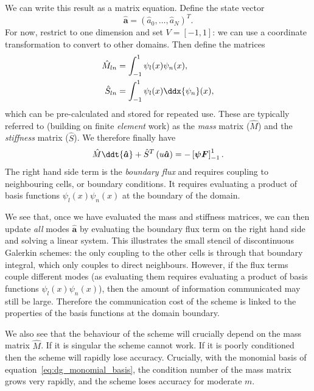 We can write this result as a matrix equation. Define the state vector
%
\begin{equation}
  \label{eq:dg_state_vector}
  \bm{\hat{a}} = (\hat{a}_0, \dots, \hat{a}_N)^T.
\end{equation}
%
For now, restrict to one dimension and set $V = [-1, 1]$: we can use a
coordinate transformation to convert to other domains. Then define the matrices
%
\begin{align}
  \label{eq:dg_mass_matrix}
  \hat{M}_{ln} &= \int_{-1}^1 \psi_l(x) \psi_n(x), \\
  \label{eq:dg_stiffness_matrix}
  \hat{S}_{ln} &= \int_{-1}^1 \psi_l(x) \ddx{\psi_n}(x),
\end{align}
%
which can be pre-calculated and stored for repeated use. These are typically
referred to (building on finite \emph{element} work) as the \emph{mass} matrix
($\hat{M}$) and the \emph{stiffness} matrix ($\hat{S}$). We therefore finally
have
%
\begin{equation}
  \label{eq:dg_advection5}
  \hat{M} \ddt{\bm{\hat{a}}} + \hat{S}^T \left( u \bm{\hat{a}} \right) =
  -\left[ \bm{\psi F} \right]_{-1}^1.
\end{equation}
%
The right hand side term is the \emph{boundary flux} and requires coupling to
neighbouring cells, or boundary conditions. It requires evaluating a product of
basis functions $\psi_l(x) \psi_n(x)$ at the boundary of the domain.

We see that, once we have evaluated the mass and stiffness matrices, we can then
update \emph{all} modes $\bm{\hat{a}}$ by evaluating the boundary flux term
on the right hand side and solving a linear system. This illustrates the small
stencil of discontinuous Galerkin schemes: the only coupling to the other cells
is through that boundary integral, which only couples to direct neighbours.
However, if the flux terms couple different modes (as evaluating them requires
evaluating a product of basis functions $\psi_l(x) \psi_n(x)$), then the amount
of information communicated may still be large. Therefore the communication cost
of the scheme is linked to the properties of the basis functions at the domain
boundary.

We also see that the behaviour of the scheme will crucially depend on the mass
matrix $\hat{M}$. If it is singular the scheme cannot work. If it is poorly
conditioned then the scheme will rapidly lose accuracy. Crucially, with the
monomial basis of equation~\ref{eq:dg_monomial_basis}, the condition number of
the mass matrix grows very rapidly, and the scheme loses accuracy for moderate
$m$.

